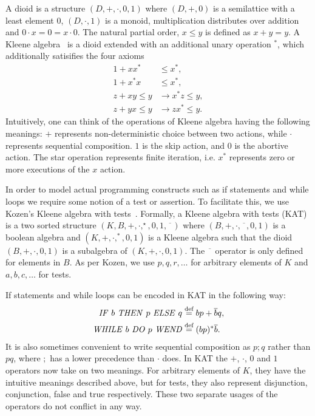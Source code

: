 \documentclass{llncs}
\newcommand{\nkat}{\overline{\phantom{x}}}
\newcommand{\ifthenelse}[3]{\text{\textit{IF} $#1$ \textit{THEN} $#2$ \textit{ELSE} $#3$}}
\newcommand{\while}[2]{\text{\textit{WHILE} $#1$ \textit{DO} $#2$ \textit{WEND}}}
\begin{document}
A dioid is a structure $(D, +, \cdot, 0, 1)$ where $(D, +, 0)$ is a
semilattice with a least element $0$, $(D, \cdot, 1)$ is a monoid,
multiplication distributes over addition and $0\cdot x = 0 = x\cdot
0$. The natural partial order, $x \le y$ is defined as $x + y = y$. A
Kleene algebra~\cite{Kozen} is a dioid extended with an additional
unary operation $^\ast$, which additionally satisifies the four axioms
\begin{align*}
1 + xx^\ast &\le x^\ast,\\
1 + x^\ast x &\le x^\ast,\\
z + xy \le y &\to x^\ast z \le y,\\
z + yx \le y &\to zx^\ast \le y.
\end{align*}
Intuitively, one can think of the operations of Kleene algebra having
the following meanings: $+$ represents non-deterministic choice
between two actions, while $\cdot$ represents sequential
composition. $1$ is the skip action, and $0$ is the abortive
action. The star operation represents finite iteration, i.e. $x^\ast$
represents zero or more executions of the $x$ action.

In order to model actual programming constructs such as if statements
and while loops we require some notion of a test or assertion. To
facilitate this, we use Kozen's Kleene algebra with
tests~\cite{Kozen97}. Formally, a Kleene algebra with tests (KAT) is
a two sorted structure $(K,B,+,\cdot,^\star,0,1,\nkat)$ where
$(B,+,\cdot,\nkat,0,1)$ is a boolean algebra and
$(K,+,\cdot,^\ast,0,1)$ is a Kleene algebra such that the dioid
$(B,+,\cdot,0,1)$ is a subalgebra of $(K,+,\cdot,0,1)$. The $\nkat$
operator is only defined for elements in $B$. As per Kozen, we use
$p,q,r,\dots$ for arbitrary elements of $K$ and $a,b,c,\dots$ for
tests.

If statements and while loops can be encoded in KAT in the following way:
\begin{align*}
\ifthenelse{b}{p}{q} &\overset{\text{def}}{=} bp + \overline{b}q,\\
\while{b}{p} &\overset{\text{def}}{=} (bp)^\ast \overline{b}.
\end{align*}
It is also sometimes convenient to write sequential composition as $p;
q$ rather than $pq$, where $;$ has a lower precedence than $\cdot$
does. In KAT the $+$, $\cdot$, $0$ and $1$ operators now take on two
meanings. For arbitrary elements of $K$, they have the intuitive
meanings described above, but for tests, they also represent
disjunction, conjunction, false and true respectively. These two
separate usages of the operators do not conflict in any way.
\end{document}
